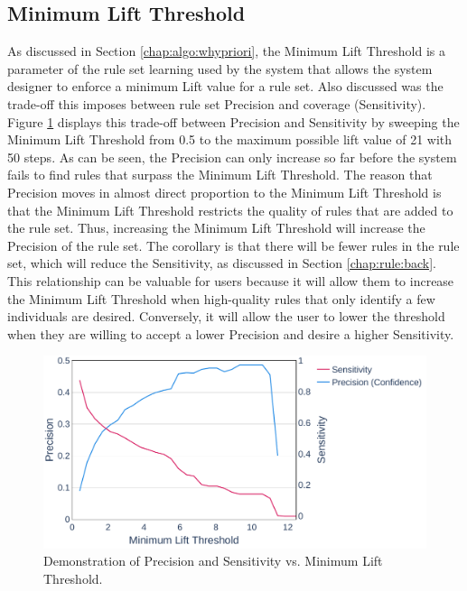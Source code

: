 \subsection{Minimum Lift Threshold} \label{chap:results:mlt}
As discussed in Section \ref{chap:algo:whypriori}, the Minimum Lift Threshold is a parameter of the rule set learning used by the \Abb system that allows the system designer to enforce a minimum Lift value for a rule set. Also discussed was the trade-off this imposes between rule set Precision and coverage (Sensitivity).
Figure \ref{fig:conf-sweep} displays this trade-off between Precision and Sensitivity by sweeping the Minimum Lift Threshold from 0.5 to the maximum possible lift value of 21 with 50 steps.
As can be seen, the Precision can only increase so far before the system fails to find rules that surpass the Minimum Lift Threshold. The reason that Precision moves in almost direct proportion to the Minimum Lift Threshold is that the Minimum Lift Threshold restricts the quality of rules that are added to the rule set. Thus, increasing the Minimum Lift Threshold will increase the Precision of the rule set. The corollary is that there will be fewer rules in the rule set, which will reduce the Sensitivity, as discussed in Section \ref{chap:rule:back}.
This relationship can be valuable for \Abb users because it will allow them to increase the Minimum Lift Threshold when high-quality rules that only identify a few individuals are desired. Conversely, it will allow the user to lower the threshold when they are willing to accept a lower Precision and desire a higher Sensitivity.


\begin{figure}[ht]
    \centering
    \includegraphics[width=1\textwidth]{Figures/Lift-Sweep.pdf}
		\caption{Demonstration of Precision and Sensitivity vs. Minimum Lift Threshold.}
    \label{fig:conf-sweep}
\end{figure}

